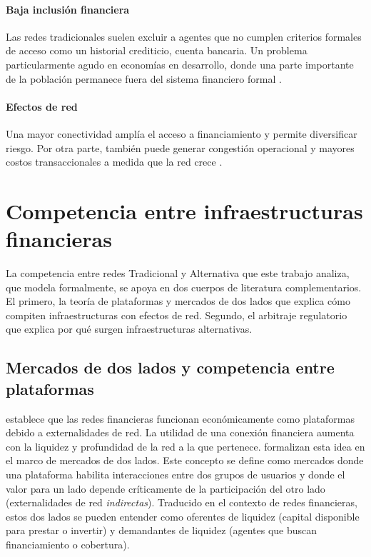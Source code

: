 \paragraph{Baja inclusión financiera}
Las redes tradicionales suelen excluir a agentes que no cumplen criterios
formales de acceso como un historial crediticio, cuenta bancaria. Un problema
particularmente agudo en economías en desarrollo, donde una parte importante de
la población permanece fuera del sistema financiero formal \cite{singer_financial_2017}.

\paragraph{Efectos de red}
Una mayor conectividad amplía el acceso a financiamiento y permite diversificar
riesgo. Por otra parte, también puede generar congestión operacional y mayores costos transaccionales a medida que la red crece \cite{hinzen_bitcoins_2022,iyengar_economics_2023}.

\section{Competencia entre infraestructuras financieras}\label{c23}

La competencia entre redes Tradicional y Alternativa que este trabajo analiza, que  modela formalmente, se apoya en dos
cuerpos de literatura complementarios. El primero, la teoría de plataformas y mercados de
dos lados que explica cómo compiten infraestructuras con efectos de red. Segundo, el arbitraje regulatorio que explica por qué surgen infraestructuras alternativas.

\subsection{Mercados de dos lados y competencia entre plataformas}

 establece que las redes financieras
funcionan económicamente como plataformas debido a externalidades de red. La
utilidad de una conexión financiera aumenta con la liquidez y profundidad de la
red a la que pertenece.  formalizan esta idea en el
marco de mercados de dos lados. Este concepto se define como mercados donde una plataforma
habilita interacciones entre dos grupos de usuarios y donde el valor para un
lado depende críticamente de la participación del otro lado (externalidades de
red \textit{indirectas}). Traducido en el contexto de redes financieras, estos dos lados se pueden entender como oferentes de liquidez (capital disponible para prestar o
invertir) y demandantes de liquidez (agentes que buscan financiamiento o
cobertura).

